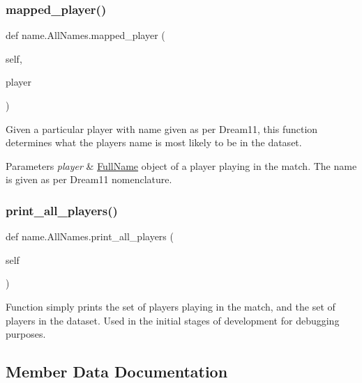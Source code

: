\subsubsection{\texorpdfstring{mapped\+\_\+player()}{mapped\_player()}}
{\footnotesize\ttfamily def name.\+All\+Names.\+mapped\+\_\+player (\begin{DoxyParamCaption}\item[{}]{self,  }\item[{}]{player }\end{DoxyParamCaption})}



Given a particular player with name given as per Dream11, this function determines what the player\textquotesingle{}s name is most likely to be in the dataset. 


\begin{DoxyParams}{Parameters}
{\em player} & \hyperlink{classname_1_1FullName}{Full\+Name} object of a player playing in the match. The name is given as per Dream11 nomenclature. \\
\hline
\end{DoxyParams}
\mbox{\label{classname_1_1AllNames_a224ad6b8dff67b909fd7bddfdbe0244f}} 
\subsubsection{\texorpdfstring{print\+\_\+all\+\_\+players()}{print\_all\_players()}}
{\footnotesize\ttfamily def name.\+All\+Names.\+print\+\_\+all\+\_\+players (\begin{DoxyParamCaption}\item[{}]{self }\end{DoxyParamCaption})}

\begin{DoxyVerb}Function simply prints the set of players playing in the match, and the set of players in the dataset. Used in the initial stages of development for debugging purposes.
\end{DoxyVerb}
 

\subsection{Member Data Documentation}
\mbox{\label{classname_1_1AllNames_a1c94841db2dd8ff636014a0029e11673}} 
